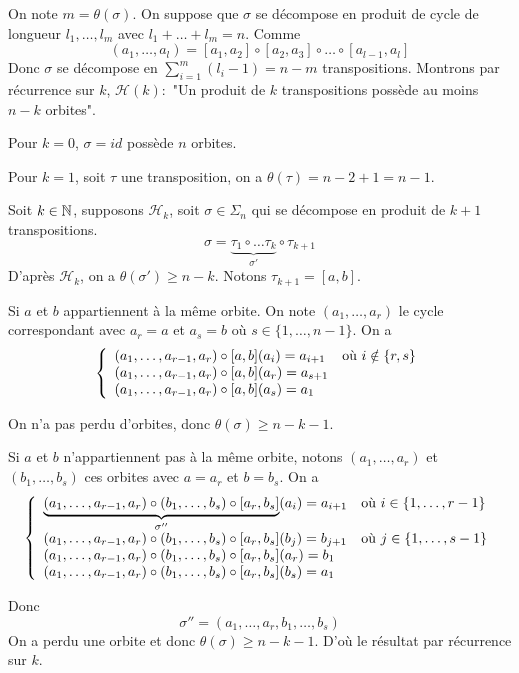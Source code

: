 \begin{solution}
	On note $m=\theta(\sigma)$. On suppose que $\sigma$ se décompose en produit de cycle de longueur $l_{1},\dots,l_{m}$ avec $l_{1}+\dots+l_{m}=n$. Comme
	$$(a_{1},\dots,a_{l})=[a_{1},a_{2}]\circ[a_{2},a_{3}]\circ\dots\circ[a_{l-1},a_{l}]$$
	Donc $\sigma$ se décompose en $\sum_{i=1}^{m}(l_{i}-1)=n-m$ transpositions. Montrons par récurrence sur $k$, $\mathcal{H}(k)\colon$ "Un produit de $k$ transpositions possède au moins $n-k$ orbites".

	Pour $k=0$, $\sigma=id$ possède $n$ orbites.

	Pour $k=1$, soit $\tau$ une transposition, on a $\theta(\tau)=n-2+1=n-1$.

	Soit $k\in\mathbb{N}$, supposons $\mathcal{H}_{k}$, soit $\sigma\in\Sigma_{n}$ qui se décompose en produit de $k+1$ transpositions.
	$$\sigma=\underbrace{\tau_{1}\circ\dots\tau_{k}}_{\sigma'}\circ\tau_{k+1}$$
	D'après $\mathcal{H}_{k}$, on a $\theta(\sigma')\geqslant n-k$. Notons $\tau_{k+1}=[a,b]$. 
	
	Si $a$ et $b$ appartiennent à la même orbite. On note $(a_{1},\dots,a_{r})$ le cycle correspondant avec $a_{r}=a$ et $a_{s}=b$ où $s\in\{1,\dots,n-1\}$. On a 
	$$
	\left\{
		\begin{array}[]{ll}
			(a_{1},\dots,a_{r-1},a_{r})\circ[a,b](a_{i})=a_{i+1} &\text{où }i\notin\{r,s\}\\
			(a_{1},\dots,a_{r-1},a_{r})\circ[a,b](a_{r})=a_{s+1}&\\
			(a_{1},\dots,a_{r-1},a_{r})\circ[a,b](a_{s})=a_{1}&
		\end{array}
	\right.
	$$

	On n'a pas perdu d'orbites, donc $\theta(\sigma)\geqslant n-k-1$. 

	Si $a$ et $b$ n'appartiennent pas à la même orbite, notons $(a_{1},\dots,a_{r})$ et $(b_{1},\dots,b_{s})$ ces orbites avec $a=a_{r}$ et $b=b_{s}$. On a 
	$$
	\left\{
		\begin{array}[]{ll}
			\underbrace{(a_{1},\dots,a_{r-1},a_{r})\circ(b_{1},\dots,b_{s})\circ[a_{r},b_{s}]}_{\sigma''}(a_{i})=a_{i+1} &\text{où }i\in\{1,\dots,r-1\}\\
			(a_{1},\dots,a_{r-1},a_{r})\circ(b_{1},\dots,b_{s})\circ[a_{r},b_{s}](b_{j})=b_{j+1} &\text{où }j\in\{1,\dots,s-1\}\\
			(a_{1},\dots,a_{r-1},a_{r})\circ(b_{1},\dots,b_{s})\circ[a_{r},b_{s}](a_{r})=b_{1}&\\
			(a_{1},\dots,a_{r-1},a_{r})\circ(b_{1},\dots,b_{s})\circ[a_{r},b_{s}](b_{s})=a_{1}&
		\end{array}
	\right.
	$$

	Donc 
	$$\sigma''=(a_{1},\dots,a_{r},b_{1},\dots,b_{s})$$
	On a perdu une orbite et donc $\theta(\sigma)\geqslant n-k-1$. D'où le résultat par récurrence sur $k$.
\end{solution}

